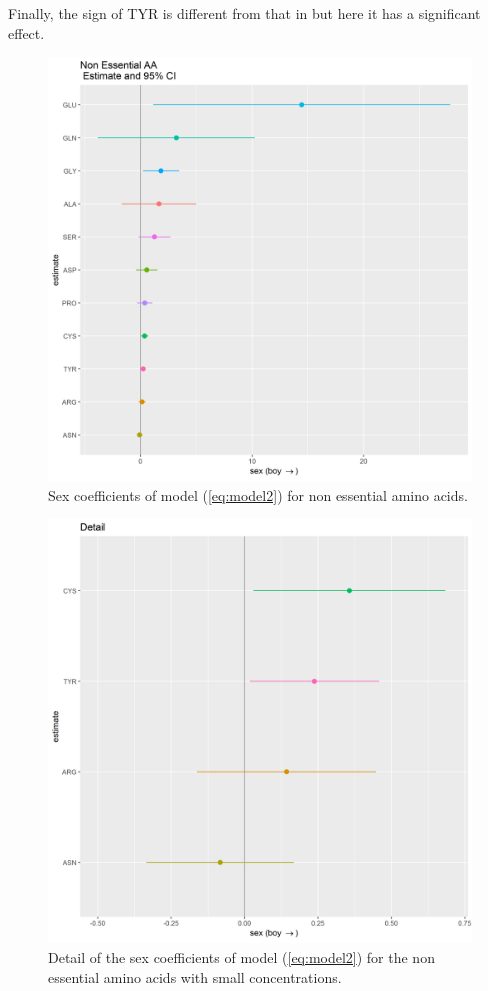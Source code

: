 \documentclass[12pt]{article}
\begin{document}
Finally, the sign of TYR is different from that in \cite{NutrientsDutch} but here it has a significant effect.

\begin{figure}[!htb]
  \includegraphics[width= \textwidth]{../sex/NEAA_coeff.png}
  \caption{Sex coefficients of model (\ref{eq:model2}) for non essential amino acids.}
  \label{fig:NEAA_coeff}
\end{figure}

\begin{figure}[!htb]
  \includegraphics[width= \textwidth]{../sex/NEAA_coeff_detail.png}
  \caption{Detail of the sex coefficients of model (\ref{eq:model2}) for the non essential amino acids with small concentrations.}
  \label{fig:NEAA_coeff_detail}
\end{figure}
\end{document}
